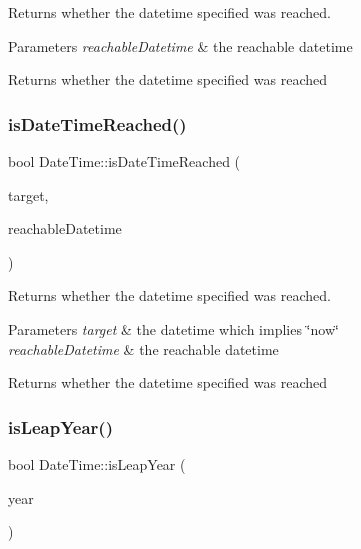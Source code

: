 Returns whether the datetime specified was reached. 


\begin{DoxyParams}{Parameters}
{\em reachable\+Datetime} & the reachable datetime \\
\hline
\end{DoxyParams}
\begin{DoxyReturn}{Returns}
whether the datetime specified was reached 
\end{DoxyReturn}
\mbox{\label{class_date_time_a5098104322ff5c66131299c5a8659999}} 
\subsubsection{\texorpdfstring{isDateTimeReached()}{isDateTimeReached()}\hspace{0.1cm}{\footnotesize\ttfamily [3/3]}}
{\footnotesize\ttfamily bool Date\+Time\+::is\+Date\+Time\+Reached (\begin{DoxyParamCaption}\item[{const \mbox{\hyperlink{class_a_string}{A\+String}} \&}]{target,  }\item[{const \mbox{\hyperlink{class_a_string}{A\+String}} \&}]{reachable\+Datetime }\end{DoxyParamCaption})\hspace{0.3cm}{\ttfamily [static]}}



Returns whether the datetime specified was reached. 


\begin{DoxyParams}{Parameters}
{\em target} & the datetime which implies \char`\"{}now\char`\"{} \\
\hline
{\em reachable\+Datetime} & the reachable datetime \\
\hline
\end{DoxyParams}
\begin{DoxyReturn}{Returns}
whether the datetime specified was reached 
\end{DoxyReturn}
\mbox{\label{class_date_time_afd597cb69bb422b066bac46c96cc5f12}} 
\subsubsection{\texorpdfstring{isLeapYear()}{isLeapYear()}}
{\footnotesize\ttfamily bool Date\+Time\+::is\+Leap\+Year (\begin{DoxyParamCaption}\item[{ushort}]{year }\end{DoxyParamCaption})\hspace{0.3cm}{\ttfamily [static]}}



